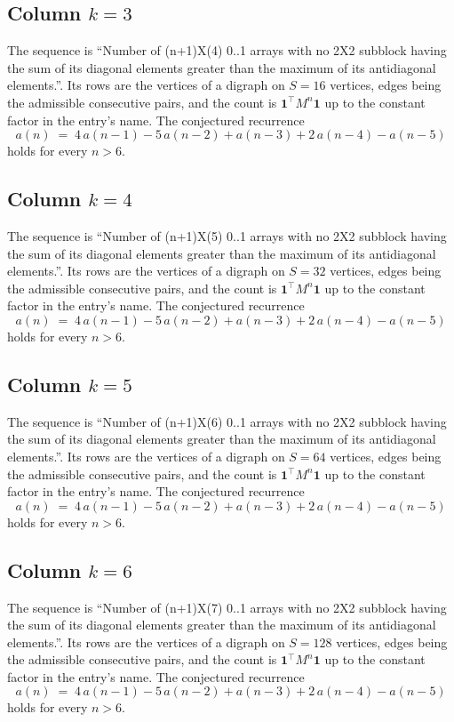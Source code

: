 \documentclass[11pt,a4paper]{article}
\theoremstyle{plain}
\theoremstyle{definition}
\begin{document}
\subsection*{Column $k=3$}
The sequence is ``Number of (n+1)X(4) 0..1 arrays with no 2X2 subblock having the sum of its diagonal elements greater than the maximum of its antidiagonal elements.''. Its rows are the vertices of a digraph on
$S=16$ vertices, edges being the admissible consecutive pairs, and the count is
$\mathbf{1}^{\!\top}M^{n}\mathbf{1}$ up to the constant factor in the entry's name.
The conjectured recurrence
\[
a(n)\;=\;4\,a(n-1) - 5\,a(n-2) + a(n-3) + 2\,a(n-4) - a(n-5)
\]
holds for every $n>6$.

\subsection*{Column $k=4$}
The sequence is ``Number of (n+1)X(5) 0..1 arrays with no 2X2 subblock having the sum of its diagonal elements greater than the maximum of its antidiagonal elements.''. Its rows are the vertices of a digraph on
$S=32$ vertices, edges being the admissible consecutive pairs, and the count is
$\mathbf{1}^{\!\top}M^{n}\mathbf{1}$ up to the constant factor in the entry's name.
The conjectured recurrence
\[
a(n)\;=\;4\,a(n-1) - 5\,a(n-2) + a(n-3) + 2\,a(n-4) - a(n-5)
\]
holds for every $n>6$.

\subsection*{Column $k=5$}
The sequence is ``Number of (n+1)X(6) 0..1 arrays with no 2X2 subblock having the sum of its diagonal elements greater than the maximum of its antidiagonal elements.''. Its rows are the vertices of a digraph on
$S=64$ vertices, edges being the admissible consecutive pairs, and the count is
$\mathbf{1}^{\!\top}M^{n}\mathbf{1}$ up to the constant factor in the entry's name.
The conjectured recurrence
\[
a(n)\;=\;4\,a(n-1) - 5\,a(n-2) + a(n-3) + 2\,a(n-4) - a(n-5)
\]
holds for every $n>6$.

\subsection*{Column $k=6$}
The sequence is ``Number of (n+1)X(7) 0..1 arrays with no 2X2 subblock having the sum of its diagonal elements greater than the maximum of its antidiagonal elements.''. Its rows are the vertices of a digraph on
$S=128$ vertices, edges being the admissible consecutive pairs, and the count is
$\mathbf{1}^{\!\top}M^{n}\mathbf{1}$ up to the constant factor in the entry's name.
The conjectured recurrence
\[
a(n)\;=\;4\,a(n-1) - 5\,a(n-2) + a(n-3) + 2\,a(n-4) - a(n-5)
\]
holds for every $n>6$.
\end{document}
